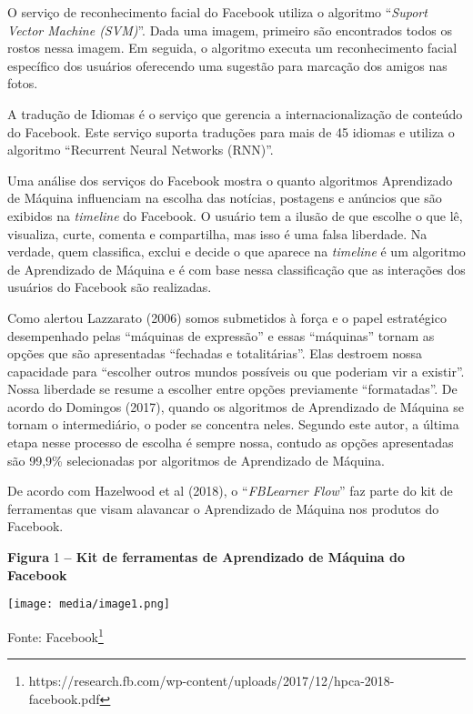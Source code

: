 O serviço de reconhecimento facial do Facebook utiliza o algoritmo
``\emph{Suport Vector Machine (SVM)}''. Dada uma imagem, primeiro são
encontrados todos os rostos nessa imagem. Em seguida, o algoritmo
executa um reconhecimento facial específico dos usuários oferecendo uma
sugestão para marcação dos amigos nas fotos.

A tradução de Idiomas é o serviço que gerencia a internacionalização de
conteúdo do Facebook. Este serviço suporta traduções para mais de 45
idiomas e utiliza o algoritmo ``Recurrent Neural Networks (RNN)''.

Uma análise dos serviços do Facebook mostra o quanto algoritmos
Aprendizado de Máquina influenciam na escolha das notícias, postagens e
anúncios que são exibidos na \emph{timeline} do Facebook. O usuário tem
a ilusão de que escolhe o que lê, visualiza, curte, comenta e
compartilha, mas isso é uma falsa liberdade. Na verdade, quem
classifica, exclui e decide o que aparece na \emph{timeline} é um
algoritmo de Aprendizado de Máquina e é com base nessa classificação que
as interações dos usuários do Facebook são realizadas.

Como alertou Lazzarato (2006) somos submetidos à força e o papel
estratégico desempenhado pelas ``máquinas de expressão'' e essas
``máquinas'' tornam as opções que são apresentadas ``fechadas e
totalitárias''. Elas destroem nossa capacidade para ``escolher outros
mundos possíveis ou que poderiam vir a existir''. Nossa liberdade se
resume a escolher entre opções previamente ``formatadas''. De acordo do
Domingos (2017), quando os algoritmos de Aprendizado de Máquina se
tornam o intermediário, o poder se concentra neles. Segundo este autor,
a última etapa nesse processo de escolha é sempre nossa, contudo as
opções apresentadas são 99,9\% selecionadas por algoritmos de
Aprendizado de Máquina.

De acordo com Hazelwood et al (2018), o ``\emph{FBLearner Flow}'' faz
parte do kit de ferramentas que visam alavancar o Aprendizado de Máquina
nos produtos do Facebook.

\textbf{Figura} 1 \textbf{-- Kit de ferramentas de Aprendizado de
Máquina do Facebook}

\texttt{[image: media/image1.png]}

Fonte: Facebook\footnote{https://research.fb.com/wp-content/uploads/2017/12/hpca-2018-facebook.pdf}

